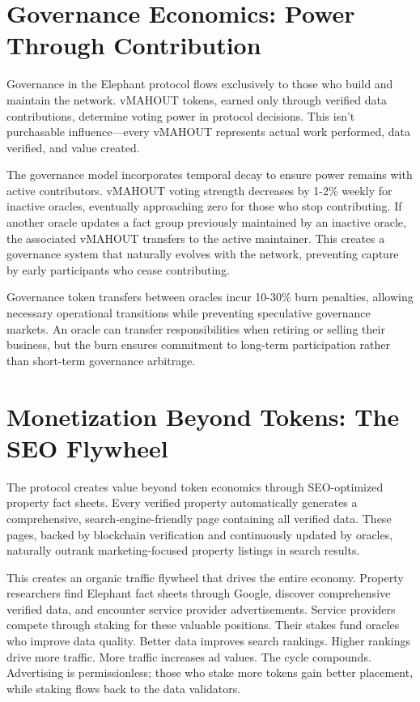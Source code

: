 \section{Governance Economics: Power Through Contribution}

Governance in the Elephant protocol flows exclusively to those who build and maintain the network. vMAHOUT tokens, earned only through verified data contributions, determine voting power in protocol decisions. This isn't purchasable influence—every vMAHOUT represents actual work performed, data verified, and value created.

The governance model incorporates temporal decay to ensure power remains with active contributors. vMAHOUT voting strength decreases by 1-2\% weekly for inactive oracles, eventually approaching zero for those who stop contributing. If another oracle updates a fact group previously maintained by an inactive oracle, the associated vMAHOUT transfers to the active maintainer. This creates a governance system that naturally evolves with the network, preventing capture by early participants who cease contributing.

Governance token transfers between oracles incur 10-30\% burn penalties, allowing necessary operational transitions while preventing speculative governance markets. An oracle can transfer responsibilities when retiring or selling their business, but the burn ensures commitment to long-term participation rather than short-term governance arbitrage.

\section{Monetization Beyond Tokens: The SEO Flywheel}

The protocol creates value beyond token economics through SEO-optimized property fact sheets. Every verified property automatically generates a comprehensive, search-engine-friendly page containing all verified data. These pages, backed by blockchain verification and continuously updated by oracles, naturally outrank marketing-focused property listings in search results.

This creates an organic traffic flywheel that drives the entire economy. Property researchers find Elephant fact sheets through Google, discover comprehensive verified data, and encounter service provider advertisements. Service providers compete through staking for these valuable positions. Their stakes fund oracles who improve data quality. Better data improves search rankings. Higher rankings drive more traffic. More traffic increases ad values. The cycle compounds. Advertising is permissionless; those who stake more tokens gain better placement, while staking flows back to the data validators.

